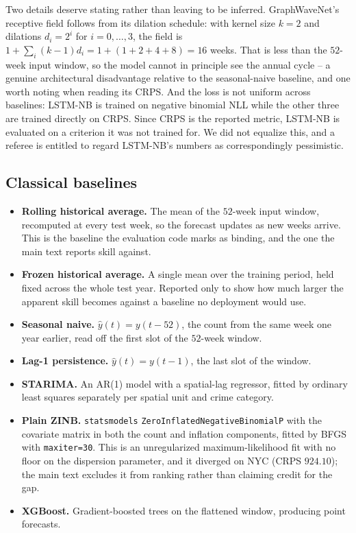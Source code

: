 \documentclass[journal,10pt,onecolumn]{IEEEtran}
\begin{document}
Two details deserve stating rather than leaving to be inferred. GraphWaveNet's
receptive field follows from its dilation schedule: with kernel size $k = 2$ and
dilations $d_i = 2^i$ for $i = 0,\dots,3$, the field is
$1 + \sum_i (k-1)d_i = 1 + (1+2+4+8) = 16$ weeks. That is less than the $52$-week
input window, so the model cannot in principle see the annual cycle -- a genuine
architectural disadvantage relative to the seasonal-naive baseline, and one worth
noting when reading its CRPS. And the loss is not uniform across baselines:
LSTM-NB is trained on negative binomial NLL while the other three are trained
directly on CRPS. Since CRPS is the reported metric, LSTM-NB is evaluated on a
criterion it was not trained for. We did not equalize this, and a referee is
entitled to regard LSTM-NB's numbers as correspondingly pessimistic.

\subsection{Classical baselines}

\begin{itemize}
  \item \textbf{Rolling historical average.} The mean of the $52$-week input
  window, recomputed at every test week, so the forecast updates as new weeks
  arrive. This is the baseline the evaluation code marks as binding, and the one
  the main text reports skill against.
  \item \textbf{Frozen historical average.} A single mean over the training
  period, held fixed across the whole test year. Reported only to show how much
  larger the apparent skill becomes against a baseline no deployment would use.
  \item \textbf{Seasonal naive.} $\hat{y}(t) = y(t-52)$, the count from the same
  week one year earlier, read off the first slot of the $52$-week window.
  \item \textbf{Lag-1 persistence.} $\hat{y}(t) = y(t-1)$, the last slot of the
  window.
  \item \textbf{STARIMA.} An AR(1) model with a spatial-lag regressor, fitted by
  ordinary least squares separately per spatial unit and crime category.
  \item \textbf{Plain ZINB.} \texttt{statsmodels}
  \texttt{ZeroInflatedNegativeBinomialP} with the covariate matrix in both the
  count and inflation components, fitted by BFGS with \texttt{maxiter=30}. This
  is an unregularized maximum-likelihood fit with no floor on the dispersion
  parameter, and it diverged on NYC (CRPS $924.10$); the main text excludes it
  from ranking rather than claiming credit for the gap.
  \item \textbf{XGBoost.} Gradient-boosted trees on the flattened window,
  producing point forecasts.
\end{itemize}
\end{document}
